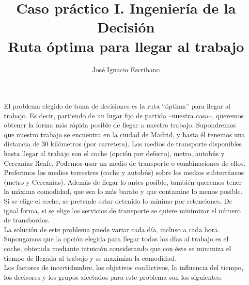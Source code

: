 \documentclass[12pt,a4paper,openright,final]{article}
\author{José Ignacio Escribano}
\title{Caso práctico I. Ingeniería de la Decisión \\ \textbf{Ruta óptima para llegar al trabajo}}
\begin{document}
\maketitle

El problema elegido de toma de decisiones es la ruta ``óptima'' para llegar al trabajo. Es decir, partiendo de un lugar fijo de partida --nuestra casa--, queremos obtener la forma más rápida posible de llegar a nuestro trabajo. Supondremos que nuestro trabajo se encuentra en la ciudad de Madrid, y hasta él tenemos una distancia de 30 kilómetros (por carretera). Los medios de transporte disponibles hasta llegar al trabajo son el coche (opción por defecto), metro, autobús y Cercanías Renfe. Podemos usar un medio de transporte o combinaciones de ellos. Preferimos los medios terrestres (coche y autobús) sobre los medios subterráneos (metro y Cercanías). Además de llegar lo antes posible, también queremos tener la máxima comodidad, que sea lo más barato y que contamine lo menos posible. Si se elige el coche, se pretende estar detenido lo mínimo por retenciones. De igual forma, si se elige los servicios de transporte se quiere minimizar el número de transbordos.\\

La solución de este problema puede variar cada día, incluso a cada hora. Supongamos que la opción elegida para llegar todos los días al trabajo es el coche, obtenida mediante intuición considerando que con éste se minimiza el tiempo de llegada al trabajo y se maximiza la comodidad.\\

Los factores de incertidumbre, los objetivos conflictivos, la influencia del tiempo, los decisores y los grupos afectados para este problema son los siguientes:
\end{document}
